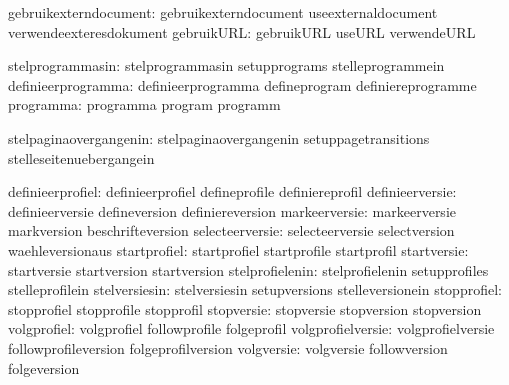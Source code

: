         gebruikexterndocument:  gebruikexterndocument        useexternaldocument
                                verwendeexteresdokument
                   gebruikURL:  gebruikURL                   useURL
                                verwendeURL

             stelprogrammasin:  stelprogrammasin             setupprograms
                                stelleprogrammein
           definieerprogramma:  definieerprogramma           defineprogram
                                definiereprogramme
                    programma:  programma                    program
                                programm

       stelpaginaovergangenin:  stelpaginaovergangenin       setuppagetransitions
                                stelleseitenuebergangein

             definieerprofiel:  definieerprofiel             defineprofile
                                definiereprofil
              definieerversie:  definieerversie              defineversion
                                definiereversion
                markeerversie:  markeerversie                markversion
                                beschrifteversion
              selecteerversie:  selecteerversie              selectversion
                                waehleversionaus
                 startprofiel:  startprofiel                 startprofile
                                startprofil
                  startversie:  startversie                  startversion
                                startversion
              stelprofielenin:  stelprofielenin              setupprofiles
                                stelleprofilein
                stelversiesin:  stelversiesin                setupversions
                                stelleversionein
                  stopprofiel:  stopprofiel                  stopprofile
                                stopprofil
                   stopversie:  stopversie                   stopversion
                                stopversion
                  volgprofiel:  volgprofiel                  followprofile
                                folgeprofil
            volgprofielversie:  volgprofielversie            followprofileversion
                                folgeprofilversion
                   volgversie:  volgversie                   followversion
                                folgeversion

